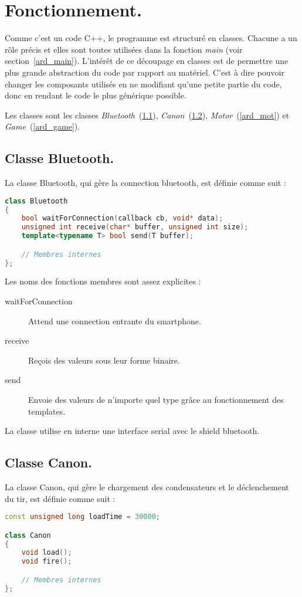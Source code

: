 \section{Fonctionnement.}
Comme c'est un code C++, le programme est structuré en classes. Chacune a un rôle précis et elles sont toutes utilisées dans la fonction \emph{main} (voir section~\ref{ard_main}). L'intérêt de ce découpage en classes est de permettre une plus grande abstraction du code par rapport au matériel. C'est à dire pouvoir changer les composants utilisés en ne modifiant qu'une petite partie du code, donc en rendant le code le plus générique possible.

Les classes sont les classes \emph{Bluetooth}~(\ref{ard_bt}), \emph{Canon}~(\ref{ard_can}), \emph{Motor}~(\ref{ard_mot}) et \emph{Game}~(\ref{ard_game}).

\subsection{Classe Bluetooth.} \label{ard_bt}
La classe Bluetooth, qui gère la connection bluetooth, est définie comme suit :
\begin{lstlisting}[language=C++]
class Bluetooth
{
	bool waitForConnection(callback cb, void* data);
	unsigned int receive(char* buffer, unsigned int size);
	template<typename T> bool send(T buffer);

	// Membres internes
};
\end{lstlisting}

Les noms des fonctions membres sont assez explicites :\begin{description}
	\item[waitForConnection] Attend une connection entrante du smartphone.
	\item[receive] Reçois des valeurs sous leur forme binaire.
	\item[send] Envoie des valeurs de n'importe quel type grâce au fonctionnement des templates.
\end{description}

La classe utilise en interne une interface serial avec le shield bluetooth.

\subsection{Classe Canon.} \label{ard_can}
La classe Canon, qui gère le chargement des condensateurs et le déclenchement du tir, est définie comme suit :
\begin{lstlisting}[language=C++]
const unsigned long loadTime = 30000;

class Canon
{
	void load();
	void fire();

	// Membres internes
};
\end{lstlisting}

